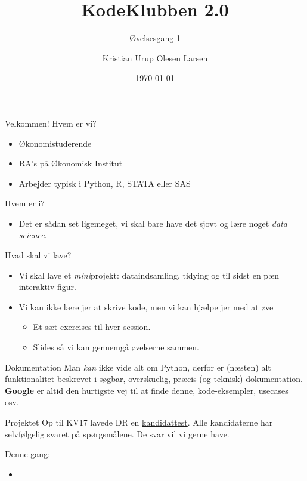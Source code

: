 \documentclass[10pt, hyperref = {colorlinks=true, linkcolor=green}]{beamer}
\title{KodeKlubben 2.0}
\subtitle{Øvelsesgang 1}
\date{\today}
\author{Kristian Urup Olesen Larsen}
\institute{Økonomisk Institut, KU}
\begin{document}
\maketitle

\begin{frame}[fragile]{Velkommen!}
Hvem er vi?
\begin{itemize}
  \item Økonomistuderende
  \item RA's på Økonomisk Institut
  \item Arbejder typisk i Python, R, STATA eller SAS
\end{itemize}
Hvem er i?
\begin{itemize}
  \item Det er sådan set ligemeget, vi skal bare have det sjovt og lære noget \textit{data science}.
\end{itemize}
\end{frame}

\begin{frame}[fragile]{Hvad skal vi lave?}
\begin{itemize}
\item Vi skal lave et \textit{mini}projekt: dataindsamling, tidying og til sidst en pæn interaktiv figur.
\item Vi kan ikke lære jer at skrive kode, men vi kan hjælpe jer med at øve
\begin{itemize}
  \item Et sæt exercises til hver session.
  \item Slides så vi kan gennemgå øvelserne sammen.
\end{itemize}
\end{itemize}


\begin{block}{Dokumentation}
Man \textit{kan} ikke vide alt om Python, derfor er (næsten) alt funktionalitet beskrevet i søgbar, overskuelig, præcis (og teknisk) dokumentation. \textbf{Google} er altid den hurtigste vej til at finde denne, kode-eksempler, usecases osv.
\end{block}

\end{frame}

\begin{frame}[fragile]{Projektet}
Op til KV17 lavede DR en \href{https://www.dr.dk/nyheder/politik/kv17/kandidat-testen}{kandidattest}. Alle kandidaterne har selvfølgelig svaret på spørgsmålene. De svar vil vi gerne have.

Denne gang:
\begin{itemize}
  \item
\end{itemize}

\end{frame}
\end{document}
